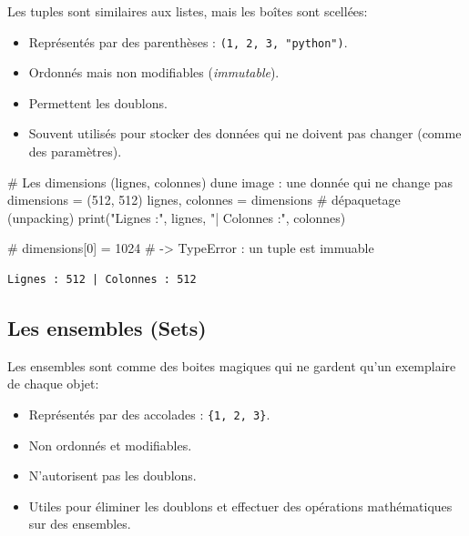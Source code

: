 \documentclass[
  french,
  11pt,
  letterpaper,
  open=any,
  twoside=false,
  french]{scrbook}
\newenvironment{Shaded}{\begin{snugshade}}{\end{snugshade}}
\newcommand{\BuiltInTok}[1]{\textcolor[rgb]{0.00,0.23,0.31}{#1}}
\newcommand{\CommentTok}[1]{\textcolor[rgb]{0.37,0.37,0.37}{#1}}
\newcommand{\DecValTok}[1]{\textcolor[rgb]{0.68,0.00,0.00}{#1}}
\newcommand{\NormalTok}[1]{\textcolor[rgb]{0.00,0.23,0.31}{#1}}
\newcommand{\OperatorTok}[1]{\textcolor[rgb]{0.37,0.37,0.37}{#1}}
\newcommand{\StringTok}[1]{\textcolor[rgb]{0.13,0.47,0.30}{#1}}
\begin{document}
Les tuples sont similaires aux listes, mais les boîtes sont scellées:

\begin{itemize}
\item
  Représentés par des parenthèses : \texttt{(1,\ 2,\ 3,\ "python")}.
\item
  Ordonnés mais non modifiables (\emph{immutable}).
\item
  Permettent les doublons.
\item
  Souvent utilisés pour stocker des données qui ne doivent pas changer
  (comme des paramètres).
\end{itemize}

\begin{Shaded}
\begin{Highlighting}[]
\CommentTok{\# Les dimensions (lignes, colonnes) d\textquotesingle{}une image : une donnée qui ne change pas}
\NormalTok{dimensions }\OperatorTok{=}\NormalTok{ (}\DecValTok{512}\NormalTok{, }\DecValTok{512}\NormalTok{)}
\NormalTok{lignes, colonnes }\OperatorTok{=}\NormalTok{ dimensions        }\CommentTok{\# dépaquetage (unpacking)}
\BuiltInTok{print}\NormalTok{(}\StringTok{"Lignes :"}\NormalTok{, lignes, }\StringTok{"| Colonnes :"}\NormalTok{, colonnes)}

\CommentTok{\# dimensions[0] = 1024   \# {-}\textgreater{} TypeError : un tuple est immuable}
\end{Highlighting}
\end{Shaded}

\begin{verbatim}
Lignes : 512 | Colonnes : 512
\end{verbatim}

\subsection{Les ensembles (Sets)}\label{les-ensembles-sets}

Les ensembles sont comme des boites magiques qui ne gardent qu'un
exemplaire de chaque objet:

\begin{itemize}
\item
  Représentés par des accolades : \texttt{\{1,\ 2,\ 3\}}.
\item
  Non ordonnés et modifiables.
\item
  N'autorisent pas les doublons.
\item
  Utiles pour éliminer les doublons et effectuer des opérations
  mathématiques sur des ensembles.
\end{itemize}
\end{document}

